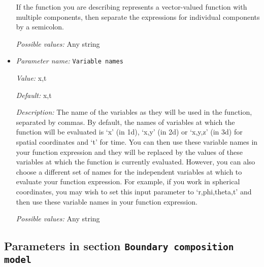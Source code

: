 \begin{itemize}
If the function you are describing represents a vector-valued function with multiple components, then separate the expressions for individual components by a semicolon.


{\it Possible values:} Any string
\item {\it Parameter name:} {\tt Variable names}
\label{parameters:Adiabatic conditions model/Initial profile/Variable names}


{\it Value:} x,t


{\it Default:} x,t


{\it Description:} The name of the variables as they will be used in the function, separated by commas. By default, the names of variables at which the function will be evaluated is `x' (in 1d), `x,y' (in 2d) or `x,y,z' (in 3d) for spatial coordinates and `t' for time. You can then use these variable names in your function expression and they will be replaced by the values of these variables at which the function is currently evaluated. However, you can also choose a different set of names for the independent variables at which to evaluate your function expression. For example, if you work in spherical coordinates, you may wish to set this input parameter to `r,phi,theta,t' and then use these variable names in your function expression.


{\it Possible values:} Any string
\end{itemize}

\subsection{Parameters in section \tt Boundary composition model}
\label{parameters:Boundary_20composition_20model}

